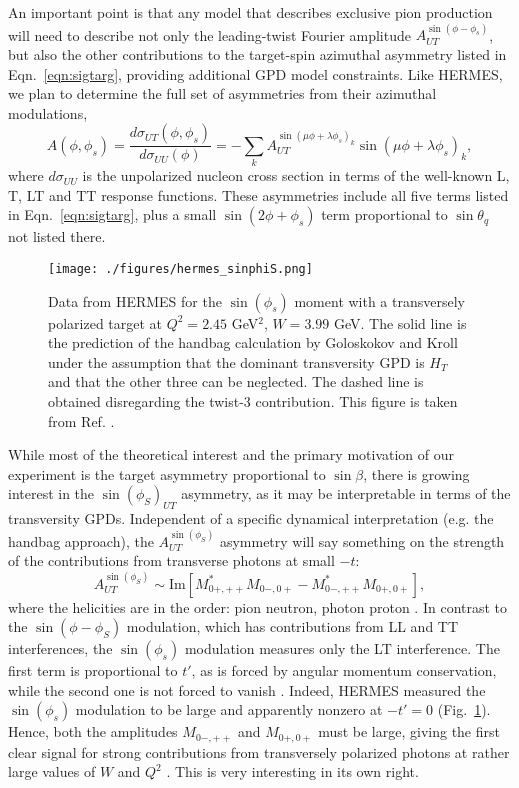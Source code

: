 An important point is that any model that describes exclusive pion production
will need to describe not only the leading-twist Fourier amplitude
$A_{UT}^{\sin(\phi-\phi_s)}$, but also the other contributions to the
target-spin azimuthal asymmetry listed in Eqn.~\ref{eqn:sigtarg}, providing
additional GPD model constraints.  Like HERMES, we plan to determine the full
set of asymmetries from their azimuthal modulations,
\begin{equation}
A(\phi,\phi_s)=\frac{d\sigma_{UT}(\phi,\phi_s)}{d\sigma_{UU}(\phi)}
=-\sum_k A_{UT}^{\sin(\mu\phi+\lambda\phi_s)_k}\sin(\mu\phi+\lambda\phi_s)_k ,
\label{eqn:six_asym}
\end{equation}
where $d\sigma_{UU}$ is the unpolarized nucleon cross section in terms of the
well-known L, T, LT and TT response functions.  These asymmetries include all
five terms listed in Eqn.~\ref{eqn:sigtarg}, plus a small
$\sin(2\phi+\phi_s)$ term proportional to $\sin\theta_q$ not listed there.

\begin{figure}[hbt!]
\begin{center}
\texttt{[image: ./figures/hermes\_sinphiS.png]}
\vspace*{-5mm}
\end{center}
\caption{\label{fig:hermes_phiS}
\footnotesize{
Data from HERMES for the $\sin(\phi_s)$ moment with a transversely polarized
target at $Q^2=2.45$ GeV$^2$, $W=3.99$ GeV.  The solid line is the prediction
of the handbag calculation by Goloskokov and Kroll under the assumption that
the dominant transversity GPD is $H_T$ and that the other three can be
neglected.  The dashed line is obtained disregarding the twist-3 contribution.
This figure is taken from Ref. .}}
\end{figure}

While most of the theoretical interest and the primary motivation of our
experiment is the target asymmetry proportional to $\sin\beta$, there is
growing interest in the $\sin(\phi_S)_{UT}$ asymmetry, as it may be
interpretable in terms of the transversity GPDs.  
Independent of a specific dynamical interpretation
(e.g. the handbag approach), the $A_{UT}^{\sin(\phi_S)}$ asymmetry will say
something on the strength of the contributions from transverse photons at
small $-t$:
\begin{equation}
A_{UT}^{\sin(\phi_S)}\sim\mathrm{Im}[M^*_{0+,++}M_{0-,0+} - M^*_{0-,++}M_{0+,0+}],
\end{equation}
where the helicities are in the order: pion neutron, photon proton
\cite{Go10}.  In contrast to the $\sin(\phi-\phi_S)$ modulation, which
has contributions from LL and TT interferences, the $\sin(\phi_s)$ modulation
measures only the LT interference.  The first term is proportional to $t'$, as
is forced by angular momentum conservation, while the second one is not forced
to vanish \cite{GoPC}.  Indeed, HERMES measured the $\sin(\phi_s)$ modulation
to be large and apparently nonzero at $-t'=0$ (Fig.~\ref{fig:hermes_phiS}).
Hence, both the amplitudes $M_{0-,++}$ and $M_{0+,0+}$ must be large, giving the
first clear signal for strong contributions from transversely polarized photons
at rather large values of $W$ and $Q^2$ \cite{Go10}.  This is very interesting
in its own right.

